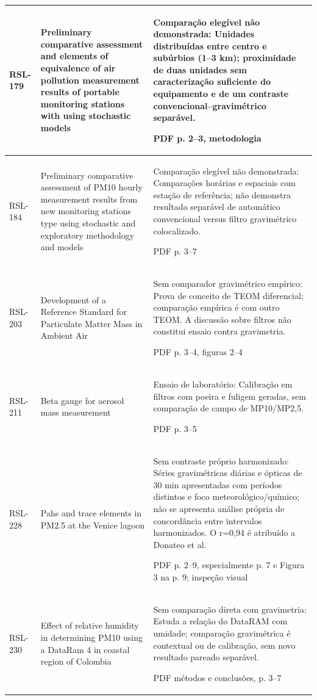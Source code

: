 \begin{longtable}{|P{0.11\textwidth}|P{0.28\textwidth}|P{\arrayrulewidth\relax}|}
RSL-179 & Preliminary comparative assessment and elements of equivalence of air pollution measurement results of portable monitoring stations with using stochastic models & Comparação elegível não demonstrada: Unidades distribuídas entre centro e subúrbios (1--3 km); proximidade de duas unidades sem caracterização suficiente do equipamento e de um contraste convencional--gravimétrico separável.\par\medskip PDF p. 2--3, metodologia\\\hline
RSL-184 & Preliminary comparative assessment of PM10 hourly measurement results from new monitoring stations type using stochastic and exploratory methodology and models & Comparação elegível não demonstrada: Comparações horárias e espaciais com estação de referência; não demonstra resultado separável de automático convencional versus filtro gravimétrico colocalizado.\par\medskip PDF p. 3--7\\\hline
RSL-203 & Development of a Reference Standard for Particulate Matter Mass in Ambient Air & Sem comparador gravimétrico empírico: Prova de conceito de TEOM diferencial; comparação empírica é com outro TEOM. A discussão sobre filtros não constitui ensaio contra gravimetria.\par\medskip PDF p. 3--4, figuras 2--4\\\hline
RSL-211 & Beta gauge for aerosol mass measurement & Ensaio de laboratório: Calibração em filtros com poeira e fuligem geradas, sem comparação de campo de MP10/MP2,5.\par\medskip PDF p. 3--5\\\hline
RSL-228 & Pahs and trace elements in PM2.5 at the Venice lagoon & Sem contraste próprio harmonizado: Séries gravimétricas diárias e ópticas de 30 min apresentadas com períodos distintos e foco meteorológico/químico; não se apresenta análise própria de concordância entre intervalos harmonizados. O r=0,94 é atribuído a Donateo et al.\par\medskip PDF p. 2--9, especialmente p. 7 e Figura 3 na p. 9; inspeção visual\\\hline
RSL-230 & Effect of relative humidity in determining PM10 using a DataRam 4 in coastal region of Colombia & Sem comparação direta com gravimetria: Estuda a relação do DataRAM com umidade; comparação gravimétrica é contextual ou de calibração, sem novo resultado pareado separável.\par\medskip PDF métodos e conclusões, p. 3--7\\\hline

\end{longtable}
